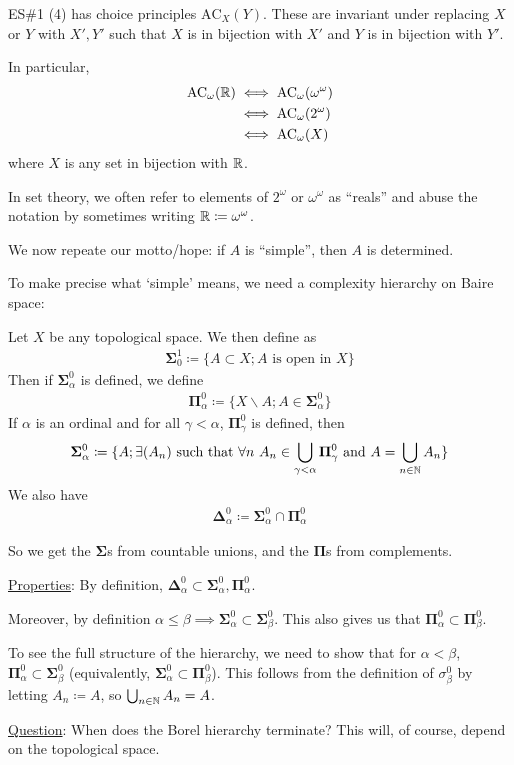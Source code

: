 \documentclass[]{article}
\newcommand{\om}{\omega}
\renewcommand{\ac}{\textrm{AC}}
\newcommand{\bosig}{\bm{\Sigma}}
\newcommand{\bopi}{\bm{\Pi}}
\newcommand{\bodel}{\bm{\Delta}}
\begin{document}
\begin{remark*}[Example]
    ES\#1 (4) has choice principles $\textrm{AC}_X(Y)$. These are invariant under replacing $X$ or $Y$ with $X',Y'$ such that $X$ is in bijection with $X'$ and $Y$ is in bijection with $Y'$.

    In particular,
    \begin{align*}
        \textrm{AC}_\om(\R) &\iff \ac_\om(\om^\om)\\
        &\iff \ac_\om(2^\om)\\
        &\iff \ac_\om(X)
    \end{align*}
    where $X$ is any set in bijection with $\mathbb{R}$.
\end{remark*}

In set theory, we often refer to elements of $2^\om$ or $\om^\om$ as ``reals'' and abuse the notation by sometimes writing $\R \coloneqq \om^\om$.

We now repeate our motto/hope: if $A$ is ``simple'', then $A$ is determined.

To make precise what `simple' means, we need a complexity hierarchy on Baire space:

\begin{defin*}
    Let $X$ be any topological space. We then define  as
    \begin{align*}
        \bm{\Sigma}_{0}^{1}\coloneqq \{A\subset X; A\textrm{ is open in }X\}
    \end{align*}
    Then if $\bm{\Sigma}^0_\alpha$ is defined, we define
    \begin{align*}
        \bm{\Pi}^0_\alpha \coloneqq \{X\backslash A; A \in \bm{\Sigma}^0_\alpha \}
    \end{align*}
    If $\alpha$ is an ordinal and for all $\gamma < \alpha$, $\bopi^0_\gamma$ is defined, then
    \begin{align*}
        \bosig^0_\alpha \coloneqq \{A; \exists (A_n)\textrm{ such that }\forall n\ A_n\in \bigcup_{\gamma<\alpha}\bopi^0_\gamma\textrm{ and }A = \bigcup_{n\in\N}A_n\}
    \end{align*}
    We also have
    \begin{align*}
        \bodel^0_\alpha \coloneqq \bosig^0_\alpha \cap \bopi^0_\alpha
    \end{align*}

    So we get the $\bosig$s from countable unions, and the $\bopi$s from complements.
\end{defin*}

\underline{Properties}: By definition, $\bodel ^0_\alpha \subset \bosig^0_\alpha,\bopi^0_\alpha$.

Moreover, by definition $\alpha \le \beta \implies \bosig^0_\alpha \subset \bosig^0_\beta$. This also gives us that $\bopi^0_\alpha \subset \bopi^0_\beta$.

To see the full structure of the hierarchy, we need to show that for $\alpha < \beta$, $\bopi^0_\alpha \subset \bosig^0_\beta$ (equivalently, $\bosig^0_\alpha \subset \bopi^0_\beta$). This follows from the definition of $\sigma^0_\beta$ by letting $A_n\coloneqq A$, so $\bigcup_{n\in \mathbb{N}}A_n = A$.

\underline{Question}: When does the Borel hierarchy terminate? This will, of course, depend on the topological space.
\end{document}
